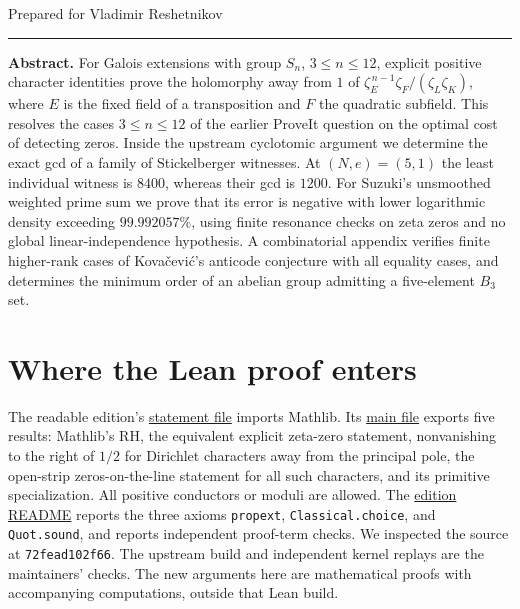 \documentclass[11pt,letterpaper]{article}
\newcommand{\src}[2]{\href{https://github.com/lsernau/grh-lean/blob/72fead102f663d5c7a407964a13dc0cf9d977207/grh/src/#1}{#2}}
\newcommand{\repo}[2]{\href{https://github.com/lsernau/grh-lean/blob/72fead102f663d5c7a407964a13dc0cf9d977207/#1}{#2}}
\begin{document}
\thispagestyle{plain}
\par
\vspace{0.5cm}
\par\vspace{4pt}
\par\vspace{0.32cm}
\noindent Prepared for Vladimir Reshetnikov\par
\vspace{0.25cm}\hrule\vspace{0.25cm}
\noindent\textbf{Abstract.}
For Galois extensions with group $S_n$, $3\le n\le12$, explicit positive
character identities prove the holomorphy away from $1$ of
$\zeta_E^{\,n-1}\zeta_F/(\zeta_L\zeta_K)$, where $E$ is the fixed field
of a transposition and $F$ the quadratic subfield. This resolves the cases $3\le n\le12$
of the earlier ProveIt question on the optimal cost of detecting zeros.
Inside the upstream cyclotomic argument we determine the exact gcd of a
family of Stickelberger witnesses. At $(N,e)=(5,1)$ the least individual
witness is $8400$, whereas their gcd is $1200$. For Suzuki's unsmoothed
weighted prime sum we prove that its error is negative with lower logarithmic
density exceeding $99.992057\%$, using finite resonance checks on zeta zeros
and no global linear-independence hypothesis. A combinatorial appendix
verifies finite higher-rank cases of Kova\v cevi\'c's anticode conjecture
with all equality cases, and determines the minimum order of an abelian group admitting a five-element
$B_3$ set.
\tableofcontents
\clearpage
\section{Where the Lean proof enters}
\label{sec:source}
The readable edition's \src{Statements.lean}{statement file} imports Mathlib.
Its \src{Main.lean}{main file} exports five results: Mathlib's RH,
the equivalent explicit zeta-zero statement, nonvanishing to the right
of $1/2$ for Dirichlet characters away from the principal pole, the
open-strip zeros-on-the-line statement for all such characters, and its
primitive specialization. All positive conductors or moduli are allowed.
The \repo{grh/README.md}{edition README} reports the three axioms
\texttt{propext}, \texttt{Classical.choice}, and \texttt{Quot.sound}, and
reports independent proof-term checks. We inspected the source at
\texttt{72fead102f66}. The upstream build and independent kernel replays
are the maintainers' checks. The new arguments here are mathematical proofs
with accompanying computations, outside that Lean build.
\end{document}
